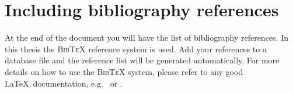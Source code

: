\section{Including bibliography references}
At the end of the document you will have the list of bibliography
references. In this thesis the \textsc{BibTeX} reference system is
used. Add your references to a database file and the reference
list will be generated automatically. For more details on how to
use the \textsc{BibTeX} system, please refer to any good \LaTeX\
documentation, e.g.\ \cite{Lamport} or \cite{Goossens}.\nocite{*}
